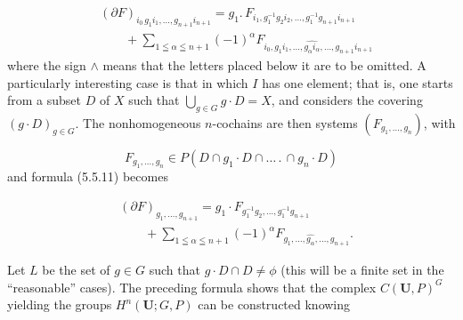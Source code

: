 \[
\tag{5.5.11}
\begin{aligned}
&(\partial F)_{i_0\,g_1i_1,\ldots,g_{n+1}i_{n+1}}
=g_1.\,F_{i_1,g_1^{-1}g_2i_2,\ldots,
g_1^{-1}g_{n+1}i_{n+1}}\\
&\qquad+\sum_{1\leqq\alpha\leqq n+1}(-1)^\alpha
F_{i_0,g_1i_1,\ldots,\widehat{g_\alpha i_\alpha},\ldots,
g_{n+1}i_{n+1}}
\end{aligned}
\]
where the sign $\wedge$ means that the letters
placed below it are to be omitted.
A particularly interesting case is that in which $I$ has one element; that is,
one starts from a subset $D$ of $X$ such that
$\displaystyle\bigcup_{g\in G}g\cdot D=X$, and considers the covering
$(g\cdot D)_{g\in G}$. The nonhomogeneous $n$-cochains are then systems
$(F_{g_1,\ldots,g_n})$, with

\[
F_{g_1,\ldots,g_n}\in
P(D\cap g_1\cdot D\cap\ldots\,.\,\cap g_n\cdot D)
\]
and formula (5.5.11) becomes

\[
\tag{5.5.11 bis}
\begin{aligned}
&(\partial F)_{g_1,\ldots,g_{n+1}}
=g_1\cdot F_{g_1^{-1}g_2,\ldots,g_1^{-1}g_{n+1}}\\
&\qquad+\sum_{1\leqq\alpha\leqq n+1}(-1)^\alpha
F_{g_1,\ldots,\widehat{g_\alpha},\ldots,g_{n+1}}.
\end{aligned}
\]

Let $L$ be the set of $g\in G$ such that $g\cdot D\cap D\ne\phi$ (this will
be a finite set in the ``reasonable'' cases). The preceding formula shows that
the complex $C({\mathbf U},P)^G$ yielding the groups $H^n({\mathbf U};G,P)$ can
be constructed knowing

